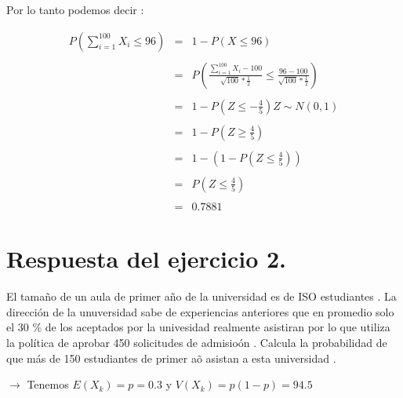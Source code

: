\documentclass[10pt]{article}
\begin{document}
    \begin{flushleft}
   	    Por lo tanto podemos decir :
    \end{flushleft}
   	\begin{equation*}
		\begin{array}{rcl}
	   	    \displaystyle P\left(\sum_{i=1}^{100}X_{i} \leq 96\right) & = & 1 -  P\left(X \leq  96\right) 
	   	    \\
	   	    \\
	   	    & = &  \displaystyle P\left(\frac{\sum_{i=1}^{100}X_{i} - 100}{\sqrt{100}* \frac{1}{2}} \leq \frac{96 - 100}{\sqrt{100}* \frac{1}{2}}\right) 
	   	    \\
	   	    \\
	   	    & = &  \displaystyle 1 - P\left(Z \leq -\frac{4}{5}\right)Z \sim N(0,1)
	   	    \\
	   	    \\
	   	    & = &  \displaystyle 1 - P\left(Z \geq \frac{4}{5}\right)
	   	    \\
	   	    \\
	   	    & = &  \displaystyle 1 -\left( 1 - P\left(Z \leq \frac{4}{5}\right)\right)
	   	    \\
	   	    \\
	   	    & = &  \displaystyle P\left(Z \leq \frac{4}{5}\right)
	   	    \\
	   	    \\
	        & = & 0.7881
	    \end{array}
	\end{equation*}
	   

  	\section*{Respuesta del ejercicio 2.} 
   	\begin{flushleft}
   		El tama\~no de un aula de primer a\~no de la universidad es de ISO estudiantes . La direcci\'on de la unuversidad sabe de experiencias anteriores que en promedio solo el 30 \% de los aceptados por la univesidad realmente asistiran por lo que utiliza la pol\'itica de aprobar 450 solicitudes de admisio\'on . Calcula  la probabilidad de que m\'as de 150 estudiantes de primer a\~o asistan a esta universidad .
   	\end{flushleft}
   
   	\begin{flushleft}
   	   	$\to$ Tenemos $ E(X_k) = p = 0.3 $ y $V(X_k) = p\left(1-p\right) = 94.5$
    \end{flushleft}
    
\end{document}
